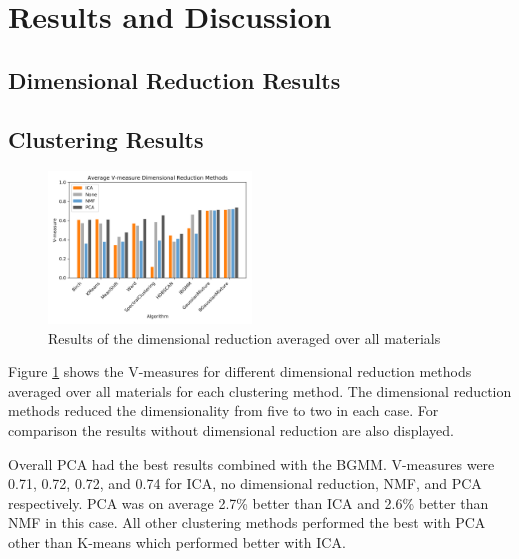 \documentclass[a4paper,11pt]{article}
\begin{document}

\section{Results and Discussion}

\subsection{Dimensional Reduction Results}

\subsection{Clustering Results}

\begin{figure}
  
  \begin{center}
    \includegraphics[width=0.48\textwidth]{figures/red_methods.png}
  \end{center}
  
  \caption{Results of the dimensional reduction averaged over all materials}
  
  \label{results:dr}
\end{figure}

Figure \ref{results:dr} shows the V-measures for different dimensional reduction methods averaged over all materials for each clustering method. The dimensional reduction methods reduced the dimensionality from five to two in each case. For comparison the results without dimensional reduction are also displayed.

Overall PCA had the best results combined with the BGMM. V-measures were 0.71, 0.72, 0.72, and 0.74 for ICA, no dimensional reduction, NMF, and PCA respectively. PCA was on average 2.7\% better than ICA and 2.6\% better than NMF in this case. All other clustering methods performed the best with PCA other than K-means which performed better with ICA.
\end{document}
